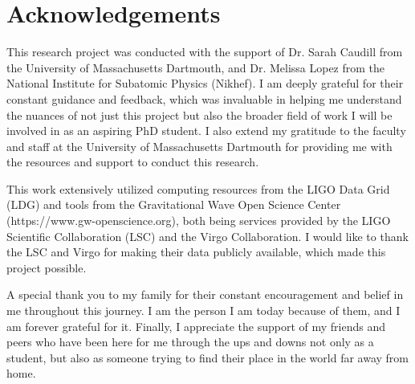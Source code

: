 \documentclass[12pt]{article}
\begin{document}
\section{Acknowledgements}\label{Acknowledgements}

\noindent This research project was conducted with the support of Dr. Sarah Caudill from the University of Massachusetts Dartmouth, and Dr. Melissa Lopez from the National Institute for Subatomic Physics (Nikhef). I am deeply grateful for their constant guidance and feedback, which was invaluable in helping me understand the nuances of not just this project but also the broader field of work I will be involved in as an aspiring PhD student. I also extend my gratitude to the faculty and staff at the University of Massachusetts Dartmouth for providing me with the resources and support to conduct this research.

\medskip
\noindent This work extensively utilized computing resources from the LIGO Data Grid (LDG) and tools from the Gravitational Wave Open Science Center (https://www.gw-openscience.org), both being services provided by the LIGO Scientific Collaboration (LSC) and the Virgo Collaboration. I would like to thank the LSC and Virgo for making their data publicly available, which made this project possible.

\medskip
\noindent A special thank you to my family for their constant encouragement and belief in me throughout this journey. I am the person I am today because of them, and I am forever grateful for it. Finally, I appreciate the support of my friends and peers who have been here for me through the ups and downs not only as a student, but also as someone trying to find their place in the world far away from home.



\end{document}
